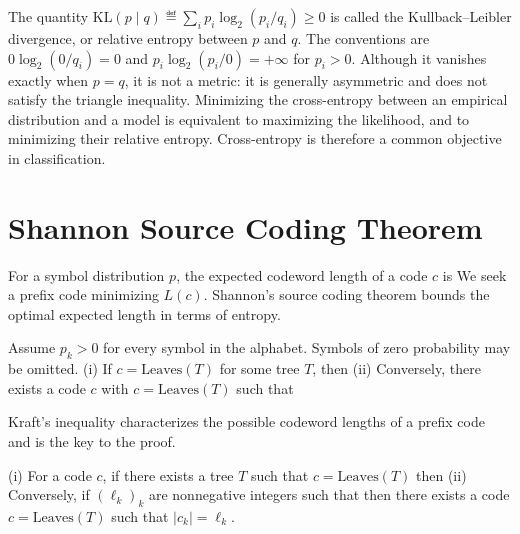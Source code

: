 The quantity $\mathrm{KL}(p\mid q)\eqdef\sum_i p_i\log_2(p_i/q_i)\geq0$ is called the Kullback--Leibler divergence, or relative entropy between $p$ and $q$. The conventions are $0\log_2(0/q_i)=0$ and $p_i\log_2(p_i/0)=+\infty$ for $p_i>0$. Although it vanishes exactly when $p=q$, it is not a metric: it is generally asymmetric and does not satisfy the triangle inequality. Minimizing the cross-entropy between an empirical distribution and a model is equivalent to maximizing the likelihood, and to minimizing their relative entropy. Cross-entropy is therefore a common objective in classification.


\section{Shannon Source Coding Theorem}

For a symbol distribution $p$, the expected codeword length of a code $c$ is
We seek a prefix code minimizing $L(c)$.
%
Shannon's source coding theorem bounds the optimal expected length in terms of entropy.

\begin{thm}\label{thm-shannon-source-coding}
Assume $p_k>0$ for every symbol in the alphabet. Symbols of zero probability may be omitted.
	(i) If $c=\text{Leaves}(T)$ for some tree $T$, then 
	(ii) Conversely, there exists a code $c$ with $c=\text{Leaves}(T)$ such that 
\end{thm} 

Kraft's inequality characterizes the possible codeword lengths of a prefix code and is the key to the proof.

\begin{lem}\label{lem-kraft}
	(i) For a code $c$, if there exists a tree $T$ such that $c=\text{Leaves}(T)$ then
	(ii) Conversely, if $(\ell_k)_k$ are nonnegative integers such that
	then there exists a code $c=\text{Leaves}(T)$ such that $|c_k|=\ell_k$.
\end{lem} 

